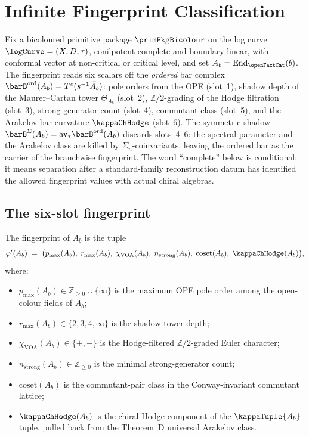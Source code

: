 \chapter{Infinite Fingerprint Classification}
\label{chap:infinite-fingerprint}
\index{$\kappaChHodge$}

Fix a bicoloured primitive package $\primPkgBicolour$ on the log curve
$\logCurve = (X, D, \tau)$, conilpotent-complete and boundary-linear,
with conformal vector at non-critical or critical level, and set $A_b =
\mathrm{End}_{\openFactCat}(b)$. The fingerprint reads six scalars off
the \emph{ordered} bar complex $\barB^{\mathrm{ord}}(A_b) =
T^c(s^{-1}\bar{A_b})$: pole orders from the OPE (slot~1), shadow depth
of the Maurer--Cartan tower $\Theta_{A_b}$ (slot~2), $\mathbb{Z}/2$-grading
of the Hodge filtration (slot~3), strong-generator count (slot~4),
commutant class (slot~5), and the Arakelov bar-curvature $\kappaChHodge$
(slot~6). The symmetric shadow $\barB^{\Sigma}(A_b) = \mathrm{av}_*
\barB^{\mathrm{ord}}(A_b)$ discards slots~4--6: the spectral parameter
and the Arakelov class are killed by $\Sigma_n$-coinvariants, leaving
the ordered bar as the carrier of the branchwise fingerprint.  The
word ``complete'' below is conditional: it means separation after a
standard-family reconstruction datum has identified the allowed
fingerprint values with actual chiral algebras.

\section{The six-slot fingerprint}
\label{sec:six-slot-fingerprint}

\begin{definition}
\label{def:fingerprint-slots}
\index{$\kappaChHodge$}
The fingerprint of $A_b$ is the tuple
\[
 \varphi'(A_b)
 \;=\;
 \bigl(p_{\max}(A_b),\;
 r_{\max}(A_b),\;
 \chi_{\mathrm{VOA}}(A_b),\;
 n_{\mathrm{strong}}(A_b),\;
 \mathrm{coset}(A_b),\;
 \kappaChHodge(A_b)\bigr),
\]
where:
\begin{itemize}
\item $p_{\max}(A_b) \in \mathbb{Z}_{\ge 0} \cup \{\infty\}$ is the
maximum OPE pole order among the open-colour fields of $A_b$;
\item $r_{\max}(A_b) \in \{2, 3, 4, \infty\}$ is the shadow-tower depth;
\item $\chi_{\mathrm{VOA}}(A_b) \in \{+, -\}$ is the Hodge-filtered
$\mathbb{Z}/2$-graded Euler character;
\item $n_{\mathrm{strong}}(A_b) \in \mathbb{Z}_{\ge 0}$ is the minimal
strong-generator count;
\item $\mathrm{coset}(A_b)$ is the commutant-pair class in the
Conway-invariant commutant lattice;
\item $\kappaChHodge(A_b)$ is the chiral-Hodge component of the
$\kappaTuple{A_b}$ tuple, pulled back from the Theorem~D universal
Arakelov class.
\end{itemize}
\end{definition}

